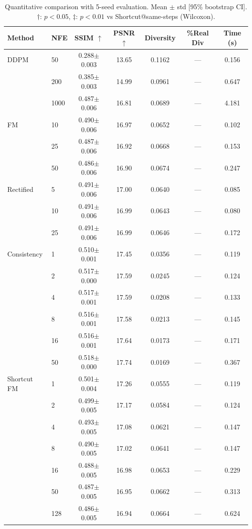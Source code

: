 \begin{table}[t]
\centering
\caption{Quantitative comparison with 5-seed evaluation. Mean $\pm$ std [95\% bootstrap CI]. $\dagger$: $p<0.05$, $\ddagger$: $p<0.01$ vs Shortcut@same-steps (Wilcoxon).}
\label{tab:main_5seed}
\footnotesize
\begin{tabular}{llccccc}
\toprule
Method & NFE & SSIM $\uparrow$ & PSNR $\uparrow$ & Diversity & \%Real Div & Time (s) \\
\midrule
  DDPM & 50 & 0.288$\pm$0.003 & 13.65 & 0.1162 & — & 0.156 \\
   & 200 & 0.385$\pm$0.003 & 14.99 & 0.0961 & — & 0.647 \\
   & 1000 & 0.487$\pm$0.006 & 16.81 & 0.0689 & — & 4.181 \\
\midrule
  FM & 10 & 0.490$\pm$0.006 & 16.97 & 0.0652 & — & 0.102 \\
   & 25 & 0.487$\pm$0.006 & 16.92 & 0.0668 & — & 0.153 \\
   & 50 & 0.486$\pm$0.006 & 16.90 & 0.0674 & — & 0.247 \\
\midrule
  Rectified & 5 & 0.491$\pm$0.006 & 17.00 & 0.0640 & — & 0.085 \\
   & 10 & 0.491$\pm$0.006 & 16.99 & 0.0643 & — & 0.080 \\
   & 25 & 0.491$\pm$0.006 & 16.99 & 0.0646 & — & 0.172 \\
\midrule
  Consistency & 1 & 0.510$\pm$0.001 & 17.45 & 0.0356 & — & 0.119 \\
   & 2 & 0.517$\pm$0.000 & 17.59 & 0.0245 & — & 0.124 \\
   & 4 & 0.517$\pm$0.001 & 17.59 & 0.0208 & — & 0.133 \\
   & 8 & 0.516$\pm$0.001 & 17.58 & 0.0213 & — & 0.145 \\
   & 16 & 0.516$\pm$0.001 & 17.64 & 0.0173 & — & 0.171 \\
   & 50 & 0.518$\pm$0.000 & 17.74 & 0.0169 & — & 0.367 \\
\midrule
  Shortcut FM & 1 & 0.501$\pm$0.004 & 17.26 & 0.0555 & — & 0.119 \\
   & 2 & 0.499$\pm$0.005 & 17.17 & 0.0584 & — & 0.124 \\
   & 4 & 0.493$\pm$0.005 & 17.08 & 0.0621 & — & 0.147 \\
   & 8 & 0.490$\pm$0.005 & 17.02 & 0.0641 & — & 0.147 \\
   & 16 & 0.488$\pm$0.005 & 16.98 & 0.0653 & — & 0.229 \\
   & 50 & 0.487$\pm$0.005 & 16.95 & 0.0662 & — & 0.313 \\
   & 128 & 0.486$\pm$0.005 & 16.94 & 0.0664 & — & 0.624 \\
\bottomrule
\end{tabular}
\end{table}